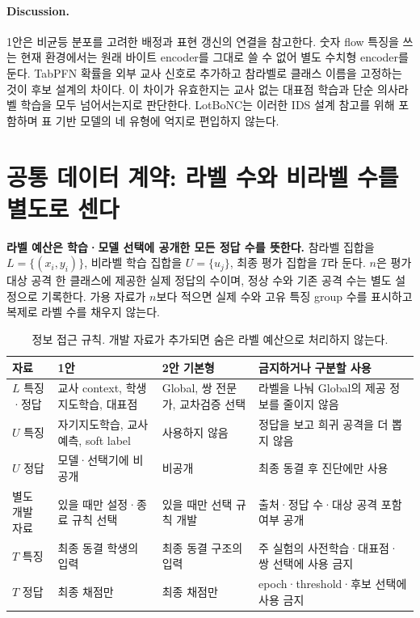 \paragraph{Discussion.}
1안은 비균등 분포를 고려한 배정과 표현 갱신의 연결을 참고한다. 숫자 flow 특징을 쓰는 현재 환경에서는 원래 바이트 encoder를 그대로 쓸 수 없어 별도 수치형 encoder를 둔다. TabPFN 확률을 외부 교사 신호로 추가하고 참라벨로 클래스 이름을 고정하는 것이 후보 설계의 차이다. 이 차이가 유효한지는 교사 없는 대표점 학습과 단순 의사라벨 학습을 모두 넘어서는지로 판단한다. LotBoNC는 이러한 IDS 설계 참고를 위해 포함하며 표 기반 모델의 네 유형에 억지로 편입하지 않는다.

\section{공통 데이터 계약: 라벨 수와 비라벨 수를 별도로 센다}
\textbf{라벨 예산은 학습·모델 선택에 공개한 모든 정답 수를 뜻한다.} 참라벨 집합을 $L=\{(x_i,y_i)\}$, 비라벨 학습 집합을 $U=\{u_j\}$, 최종 평가 집합을 $T$라 둔다. $n$은 평가 대상 공격 한 클래스에 제공한 실제 정답의 수이며, 정상 수와 기존 공격 수는 별도 설정으로 기록한다. 가용 자료가 $n$보다 적으면 실제 수와 고유 특징 group 수를 표시하고 복제로 라벨 수를 채우지 않는다.

\begin{table}[H]\centering\small
\caption{정보 접근 규칙. 개발 자료가 추가되면 숨은 라벨 예산으로 처리하지 않는다.}
\begin{tabularx}{\linewidth}{p{.15\linewidth}YYY}
\toprule
자료 & 1안 & 2안 기본형 & 금지하거나 구분할 사용\\\midrule
$L$ 특징·정답 & 교사 context, 학생 지도학습, 대표점 & Global, 쌍 전문가, 교차검증 선택 & 라벨을 나눠 Global의 제공 정보를 줄이지 않음\\
$U$ 특징 & 자기지도학습, 교사 예측, soft label & 사용하지 않음 & 정답을 보고 희귀 공격을 더 뽑지 않음\\
$U$ 정답 & 모델·선택기에 비공개 & 비공개 & 최종 동결 후 진단에만 사용\\
별도 개발 자료 & 있을 때만 설정·종료 규칙 선택 & 있을 때만 선택 규칙 개발 & 출처·정답 수·대상 공격 포함 여부 공개\\
$T$ 특징 & 최종 동결 학생의 입력 & 최종 동결 구조의 입력 & 주 실험의 사전학습·대표점·쌍 선택에 사용 금지\\
$T$ 정답 & 최종 채점만 & 최종 채점만 & epoch·threshold·후보 선택에 사용 금지\\\bottomrule
\end{tabularx}
\end{table}


